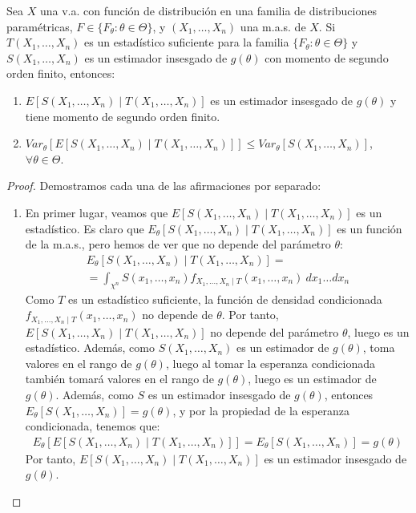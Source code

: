 \begin{teo}
    Sea $X$ una v.a. con función de distribución en una familia de distribuciones paramétricas, $F \in \{F_\theta : \theta \in \Theta\}$, y $(X_1, \ldots, X_n)$ una m.a.s. de $X$. Si $T(X_1, \ldots, X_n)$ es un estadístico suficiente para la familia $\{F_\theta : \theta \in \Theta\}$ y $S(X_1, \ldots, X_n)$ es un estimador insesgado de $g(\theta)$ con momento de segundo orden finito, entonces:
    \begin{enumerate}
        \item $E[S(X_1, \ldots, X_n) \mid T(X_1, \ldots, X_n)]$ es un estimador insesgado de $g(\theta)$ y tiene momento de segundo orden finito.
        \item $Var_\theta\left[E[S(X_1, \ldots, X_n) \mid T(X_1, \ldots, X_n)]\right] \leq Var_\theta[S(X_1, \ldots, X_n)]$, $\forall \theta \in \Theta$.
    \end{enumerate}
    \begin{proof}
        Demostramos cada una de las afirmaciones por separado:
        \begin{enumerate}
            \item En primer lugar, veamos que $E[S(X_1, \ldots, X_n) \mid T(X_1, \ldots, X_n)]$ es un estadístico. Es claro que $E_\theta[S(X_1, \ldots, X_n) \mid T(X_1, \ldots, X_n)]$ es un función de la m.a.s., pero hemos de ver que no depende del parámetro $\theta$:
            \begin{multline*}
                E_\theta[S(X_1, \ldots, X_n) \mid T(X_1, \ldots, X_n)]
                =\\= \int_{\chi^n} S(x_1, \ldots, x_n) f_{X_1, \ldots, X_n \mid T}(x_1, \ldots, x_n)\ dx_1 \ldots dx_n
            \end{multline*}
            Como $T$ es un estadístico suficiente, la función de densidad condicionada $f_{X_1, \ldots, X_n \mid T}(x_1, \ldots, x_n)$ no depende de $\theta$. Por tanto, $E[S(X_1, \ldots, X_n) \mid T(X_1, \ldots, X_n)]$ no depende del parámetro $\theta$, luego es un estadístico. Además, como $S(X_1, \ldots, X_n)$ es un estimador de $g(\theta)$, toma valores en el rango de $g(\theta)$, luego al tomar la esperanza condicionada también tomará valores en el rango de $g(\theta)$, luego es un estimador de $g(\theta)$. Además, como $S$ es un estimador insesgado de $g(\theta)$, entonces $E_\theta[S(X_1, \ldots, X_n)] = g(\theta)$, y por la propiedad de la esperanza condicionada, tenemos que:
            \begin{align*}
                E_\theta[E[S(X_1, \ldots, X_n) \mid T(X_1, \ldots, X_n)]] = E_\theta[S(X_1, \ldots, X_n)] = g(\theta)
            \end{align*}
            Por tanto, $E[S(X_1, \ldots, X_n) \mid T(X_1, \ldots, X_n)]$ es un estimador insesgado de $g(\theta)$.


\end{enumerate}
\end{proof}
\end{teo}
